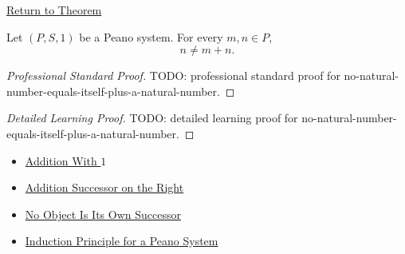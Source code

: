 \newpage
{}
\label{prf:no-natural-number-equals-itself-plus-a-natural-number}

\begin{remark*}[Return]
\hyperref[thm:no-natural-number-equals-itself-plus-a-natural-number]{Return to Theorem}
\end{remark*}

\begin{theorem*}
Let $(P,S,1)$ be a Peano system. For every $m,n \in P$,
\[
n \neq m+n.
\]
\end{theorem*}

\begin{proof}[Professional Standard Proof]
\LRAProofBodyStart
TODO: professional standard proof for no-natural-number-equals-itself-plus-a-natural-number.
\end{proof}

\begin{proof}[Detailed Learning Proof]
\LRAProofBodyStart
TODO: detailed learning proof for no-natural-number-equals-itself-plus-a-natural-number.
\end{proof}

\begin{remark*}
\end{remark*}

\begin{dependencies}
\begin{itemize}
  \item \hyperref[thm:addition-with-one]{Addition With $1$}
  \item \hyperref[thm:addition-successor-on-right]{Addition Successor on the Right}
  \item \hyperref[thm:no-object-is-its-own-successor]{No Object Is Its Own Successor}
  \item \hyperref[thm:induction-principle-for-peano-system]{Induction Principle for a Peano System}
\end{itemize}
\end{dependencies}

\clearpage
